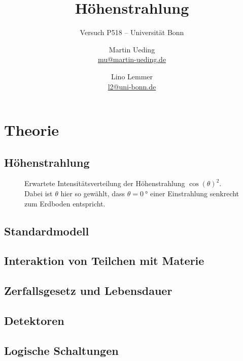 \documentclass[11pt, ngerman, fleqn, DIV=15, headinclude, BCOR=2cm]{scrreprt}
\title{Höhenstrahlung}
\subtitle{Versuch P518 -- Universität Bonn}
\author{
    Martin Ueding \\ \small{\href{mailto:mu@martin-ueding.de}{mu@martin-ueding.de}}
    \and
    Lino Lemmer \\
    \small{\href{mailto:l2@uni-bonn.de}{l2@uni-bonn.de}}
}
\date{\daterange{2014-07-02}{2014-07-03}}
\begin{document}
\maketitle

\begin{abstract}
\end{abstract}

\tableofcontents

\chapter{Theorie}

\section{Höhenstrahlung}

\begin{figure}[htbp]
    \centering
    \caption{%
        Erwartete Intensitätsverteilung der Höhenstrahlung $\cos(\theta)^2$.
        Dabei ist $\theta$ hier so gewählt, dass $\theta = \SI{0}{\degree}$
        einer Einstrahlung senkrecht zum Erdboden entspricht.
    }
    \label{fig:cos2}
\end{figure}

\section{Standardmodell}

\section{Interaktion von Teilchen mit Materie}

\section{Zerfallsgesetz und Lebensdauer}

\section{Detektoren}

\section{Logische Schaltungen}
\end{document}

